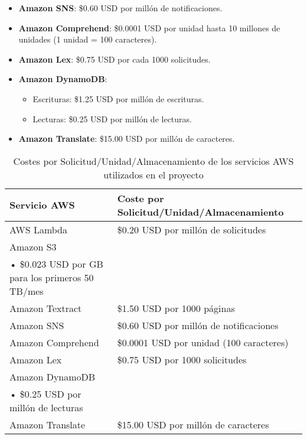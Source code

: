 \begin{enumerate}
\begin{enumerate}
\begin{itemize}
					\item \textbf{Amazon SNS}: \$0.60 USD por millón de notificaciones.

					\item \textbf{Amazon Comprehend}: \$0.0001 USD por unidad hasta 10
						millones de unidades (1 unidad = 100 caracteres).

					\item \textbf{Amazon Lex}: \$0.75 USD por cada 1000 solicitudes.

					\item \textbf{Amazon DynamoDB}:
						\begin{itemize}
							\item Escrituras: \$1.25 USD por millón de escrituras.

							\item Lecturas: \$0.25 USD por millón de lecturas.
						\end{itemize}

					\item \textbf{Amazon Translate}: \$15.00 USD por millón de caracteres.
				\end{itemize}

				\begin{table}[h]
					\centering
					\begin{tabularx}
						{\textwidth}{@{}lX@{}} \toprule \textbf{Servicio AWS} & \textbf{Coste
						por Solicitud/Unidad/Almacenamiento} \\ \midrule AWS Lambda & \$0.20
						USD por millón de solicitudes \\ Amazon S3 &
						\begin{tabular}[t]{@{}l@{}}
							• \$0.00045 USD por 1000 solicitudes             \\
							• \$0.023 USD por GB para los primeros 50 TB/mes
						\end{tabular}
						\\ Amazon Textract & \$1.50 USD por 1000 páginas \\ Amazon SNS & \$0.60
						USD por millón de notificaciones \\ Amazon Comprehend & \$0.0001 USD
						por unidad (100 caracteres) \\ Amazon Lex & \$0.75 USD por 1000 solicitudes
						\\ Amazon DynamoDB &
						\begin{tabular}[t]{@{}l@{}}
							• \$1.25 USD por millón de escrituras \\
							• \$0.25 USD por millón de lecturas
						\end{tabular}
						\\ Amazon Translate & \$15.00 USD por millón de caracteres \\
						\bottomrule
					\end{tabularx}
					\caption{Costes por Solicitud/Unidad/Almacenamiento de los servicios
					AWS utilizados en el proyecto}
					\label{tab:costes_aws}
				\end{table}


\end{enumerate}
\end{enumerate}
